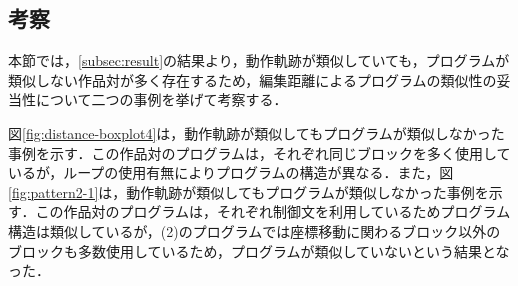\documentclass[T,J]{fose} %
\begin{document}


\subsection{考察}
本節では，\ref{subsec:result}の結果より，動作軌跡が類似していても，プログラムが類似しない作品対が多く存在するため，編集距離によるプログラムの類似性の妥当性について二つの事例を挙げて考察する．

図\ref{fig:distance-boxplot4}は，動作軌跡が類似してもプログラムが類似しなかった事例を示す．この作品対のプログラムは，それぞれ同じブロックを多く使用しているが，ループの使用有無によりプログラムの構造が異なる．また，図\ref{fig:pattern2-1}は，動作軌跡が類似してもプログラムが類似しなかった事例を示す．この作品対のプログラムは，それぞれ制御文を利用しているためプログラム構造は類似しているが，(2)のプログラムでは座標移動に関わるブロック以外のブロックも多数使用しているため，プログラムが類似していないという結果となった．
\end{document}
